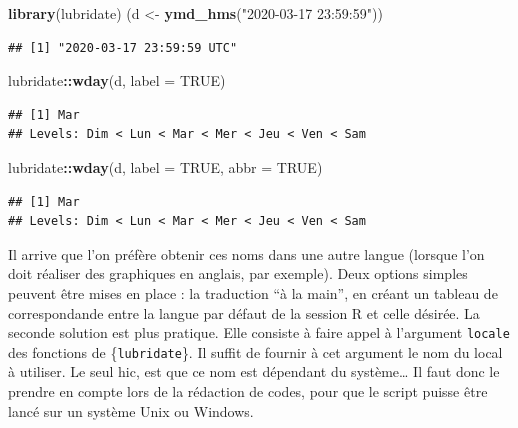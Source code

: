 \documentclass[
  11pt,
]{book}
\newenvironment{Shaded}{\begin{snugshade}}{\end{snugshade}}
\newcommand{\DataTypeTok}[1]{\textcolor[rgb]{0.13,0.29,0.53}{#1}}
\newcommand{\KeywordTok}[1]{\textcolor[rgb]{0.13,0.29,0.53}{\textbf{#1}}}
\newcommand{\NormalTok}[1]{#1}
\newcommand{\OperatorTok}[1]{\textcolor[rgb]{0.81,0.36,0.00}{\textbf{#1}}}
\newcommand{\OtherTok}[1]{\textcolor[rgb]{0.56,0.35,0.01}{#1}}
\newcommand{\StringTok}[1]{\textcolor[rgb]{0.31,0.60,0.02}{#1}}
\numberwithin{equation}{section}
\numberwithin{countremarque}{section}
\begin{document}
\begin{Shaded}
\begin{Highlighting}[]
\KeywordTok{library}\NormalTok{(lubridate)}
\NormalTok{(d \textless{}{-}}\StringTok{ }\KeywordTok{ymd\_hms}\NormalTok{(}\StringTok{"2020{-}03{-}17 23:59:59"}\NormalTok{))}
\end{Highlighting}
\end{Shaded}

\begin{lstlisting}
## [1] "2020-03-17 23:59:59 UTC"
\end{lstlisting}

\begin{Shaded}
\begin{Highlighting}[]
\NormalTok{lubridate}\OperatorTok{::}\KeywordTok{wday}\NormalTok{(d, }\DataTypeTok{label =} \OtherTok{TRUE}\NormalTok{)}
\end{Highlighting}
\end{Shaded}

\begin{lstlisting}
## [1] Mar
## Levels: Dim < Lun < Mar < Mer < Jeu < Ven < Sam
\end{lstlisting}

\begin{Shaded}
\begin{Highlighting}[]
\NormalTok{lubridate}\OperatorTok{::}\KeywordTok{wday}\NormalTok{(d, }\DataTypeTok{label =} \OtherTok{TRUE}\NormalTok{, }\DataTypeTok{abbr =} \OtherTok{TRUE}\NormalTok{)}
\end{Highlighting}
\end{Shaded}

\begin{lstlisting}
## [1] Mar
## Levels: Dim < Lun < Mar < Mer < Jeu < Ven < Sam
\end{lstlisting}

Il arrive que l'on préfère obtenir ces noms dans une autre langue (lorsque l'on doit réaliser des graphiques en anglais, par exemple). Deux options simples peuvent être mises en place : la traduction ``à la main'', en créant un tableau de correspondande entre la langue par défaut de la session R et celle désirée. La seconde solution est plus pratique. Elle consiste à faire appel à l'argument \texttt{locale} des fonctions de \{\texttt{lubridate}\}. Il suffit de fournir à cet argument le nom du local à utiliser. Le seul hic, est que ce nom est dépendant du système\ldots{} Il faut donc le prendre en compte lors de la rédaction de codes, pour que le script puisse être lancé sur un système Unix ou Windows.
\end{document}
